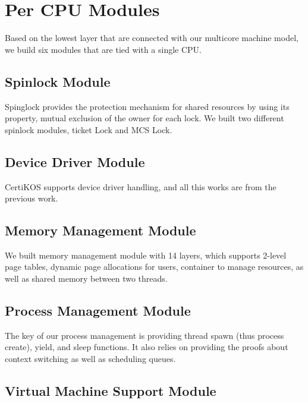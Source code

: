 \section{Per CPU Modules}
\label{chapter:certikos:sec:per-cpu-modules}


Based on the lowest layer that are connected with our multicore machine model, 
we build six modules that are tied with a single CPU.

\subsection{Spinlock Module}
\label{chapter:certikos:subsec:spinlock-module}

Spinglock provides the protection mechanism for shared resources by using its property, mutual exclusion of the owner for each lock. 
We built two different spinlock modules, ticket Lock and MCS Lock.


\subsection{Device Driver Module}
\label{chapter:certikos:subsec:device-driver-module}

CertiKOS supports device driver handling, and all this works are from the previous work.

\subsection{Memory Management Module}
\label{chapter:certikos:subsec:memory-management-module}

We built memory management module with 14 layers, 
which supports 2-level page tables, dynamic page allocations for users, 
container to manage resources, 
as well as shared memory between two threads. 

\subsection{Process Management Module}
\label{chapter:certikos:subsec:process-management-module}

The key of our process management is providing 
thread spawn (thus process create), yield, and sleep functions.
It also relies on providing the proofs about 
context switching as well as scheduling queues.

\subsection{Virtual Machine Support Module}
\label{chapter:certikos:subsec:virtual-machine-support-module}

